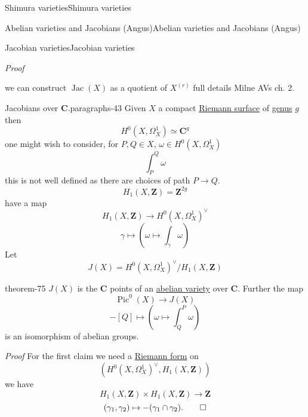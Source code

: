 \documentclass[10pt,]{book}
\makeatletter
\renewcommand*{\proofname}{Proof}
\renewenvironment{proof}[1][\proofname]{\par
  \pushQED{\qed}%
  \normalfont \topsep6\p@\@plus6\p@\relax
  \trivlist
  \item\relax
    {\itshape
    #1\@addpunct{.}}\hspace\labelsep\ignorespaces
}{%
  \popQED\endtrivlist\@endpefalse
}
\numberwithin{equation}{section}
\newcommand{\ZZ}{\mathbf{Z}}
\newcommand{\CC}{\mathbf{C}}
\DeclareMathOperator{\Pic}{Pic}
\DeclareMathOperator{\Jac}{Jac}
\makeatother
\begin{document}
\begin{chapterptx}{Shimura varieties}{}{Shimura varieties}{}{}
\begin{sectionptx}{Abelian varieties and Jacobians (Angus)}{}{Abelian varieties and Jacobians (Angus)}{}{}
\begin{subsectionptx}{Jacobian varieties}{}{Jacobian varieties}{}{}
\begin{proof}
we can construct \(\Jac(X)\) as a quotient of \(X^{(r)}\) full details Milne AVs ch. 2.%
\end{proof}
\begin{paragraphs}{Jacobians over \(\CC\).}{paragraphs-43}%
\hypertarget{p-1106}{}%
Given \(X\) a compact \hyperref[def-top-riem-surface]{Riemann surface} of \hyperref[def-class-set]{genus} \(g\) then%
\begin{equation*}
H^0(X, \Omega_X^1) \simeq \CC^g
\end{equation*}
one might wish to consider, for \(P,Q \in X\), \(\omega\in H^0(X, \Omega_X^1)\)%
\begin{equation*}
\int_P^Q \omega
\end{equation*}
this is not well defined as there are choices of path \(P\to Q\).%
\begin{equation*}
H_1(X,\ZZ) = \ZZ^{2g}
\end{equation*}
have  a map%
\begin{equation*}
H_1(X,\ZZ) \to H^0(X, \Omega_X^1) ^\vee
\end{equation*}
%
\begin{equation*}
\gamma \mapsto (\omega \mapsto \int_\gamma \omega)
\end{equation*}
Let%
\begin{equation*}
J(X) = H^0(X, \Omega_X^1) ^\vee/H_1(X,\ZZ)
\end{equation*}
%
\begin{theorem}{}{}{theorem-75}%
\hypertarget{p-1107}{}%
\(J(X) \) is the \(\CC\) points of an \hyperref[def-buntes-abvar]{abelian variety} over \(\CC\). Further the map%
\begin{equation*}
\Pic^0(X) \to J(X)
\end{equation*}
%
\begin{equation*}
[P] - [Q] \mapsto (\omega \mapsto \int^P_Q \omega)
\end{equation*}
is an isomorphism of abelian groups.%
\end{theorem}
\begin{proof}\hypertarget{proof-114}{}
\hypertarget{p-1108}{}%
For the first claim we need a \hyperref[def-riemann-form]{Riemann form} on%
\begin{equation*}
(H^0(X, \Omega_X^1)^\vee , H_1(X,\ZZ))
\end{equation*}
we have%
\begin{equation*}
H_1(X, \ZZ) \times H_1(X, \ZZ) \to \ZZ
\end{equation*}
%
\begin{equation*}
(\gamma_1, \gamma_2) \mapsto -(\gamma_1\cap \gamma_2)\text{.}\qedhere

\end{equation*}
\end{proof}
\end{paragraphs}
\end{subsectionptx}
\end{sectionptx}
\end{chapterptx}
\end{document}
